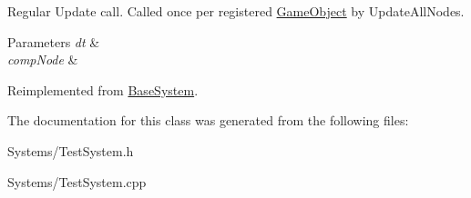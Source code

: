 Regular Update call. Called once per registered \hyperlink{classGameObject}{Game\+Object} by Update\+All\+Nodes. 


\begin{DoxyParams}{Parameters}
{\em dt} & \\
\hline
{\em comp\+Node} & \\
\hline
\end{DoxyParams}


Reimplemented from \hyperlink{classBaseSystem_a465191589a1ef8b8f3a8e20fa4656d47}{Base\+System}.



The documentation for this class was generated from the following files\+:\begin{DoxyCompactItemize}
\item 
Systems/Test\+System.\+h\item 
Systems/Test\+System.\+cpp\end{DoxyCompactItemize}

